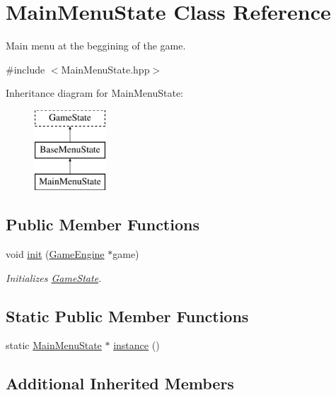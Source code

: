 \hypertarget{class_main_menu_state}{}\section{Main\+Menu\+State Class Reference}
\label{class_main_menu_state}


Main menu at the beggining of the game.  




{\ttfamily \#include $<$Main\+Menu\+State.\+hpp$>$}

Inheritance diagram for Main\+Menu\+State\+:\begin{figure}[H]
\begin{center}
\leavevmode
\includegraphics[height=3.000000cm]{class_main_menu_state}
\end{center}
\end{figure}
\subsection*{Public Member Functions}
\begin{DoxyCompactItemize}
\item 
void \mbox{\hyperlink{class_main_menu_state_a83efff7f63145d55d1937e76970d2a25}{init}} (\mbox{\hyperlink{class_game_engine}{Game\+Engine}} $\ast$game)
\begin{DoxyCompactList}\small\item\em Initializes \mbox{\hyperlink{class_game_state}{Game\+State}}. \end{DoxyCompactList}\end{DoxyCompactItemize}
\subsection*{Static Public Member Functions}
\begin{DoxyCompactItemize}
\item 
static \mbox{\hyperlink{class_main_menu_state}{Main\+Menu\+State}} $\ast$ \mbox{\hyperlink{class_main_menu_state_aa74b0c80e78c1ef8f04da374a0907414}{instance}} ()
\end{DoxyCompactItemize}
\subsection*{Additional Inherited Members}


